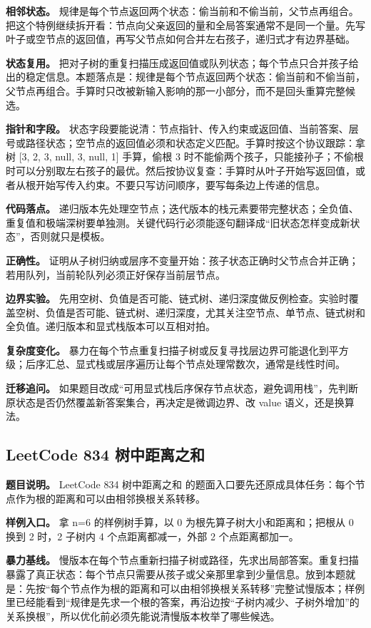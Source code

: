 \textbf{相邻状态。} 规律是每个节点返回两个状态：偷当前和不偷当前，父节点再组合。把这个特例继续拆开看：节点向父亲返回的量和全局答案通常不是同一个量。先写叶子或空节点的返回值，再写父节点如何合并左右孩子，递归式才有边界基础。

\textbf{状态复用。} 把对子树的重复扫描压成返回值或队列状态；每个节点只合并孩子给出的稳定信息。本题落点是：规律是每个节点返回两个状态：偷当前和不偷当前，父节点再组合。手算时只改被新输入影响的那一小部分，而不是回头重算完整候选。

\textbf{指针和字段。} 状态字段要能说清：节点指针、传入约束或返回值、当前答案、层号或路径状态；空节点的返回值必须和状态定义匹配。手算时按这个协议跟踪：拿树 [3, 2, 3, null, 3, null, 1] 手算，偷根 3 时不能偷两个孩子，只能接孙子；不偷根时可以分别取左右孩子的最优。然后按协议复查：手算时从叶子开始写返回值，或者从根开始写传入约束。不要只写访问顺序，要写每条边上传递的信息。

\textbf{代码落点。} 递归版本先处理空节点；迭代版本的栈元素要带完整状态；全负值、重复值和极端深树要单独测。关键代码行必须能逐句翻译成“旧状态怎样变成新状态”，否则就只是模板。

\textbf{正确性。} 证明从子树归纳或层序不变量开始：孩子状态正确时父节点合并正确；若用队列，当前轮队列必须正好保存当前层节点。

\textbf{边界实验。} 先用空树、负值是否可能、链式树、递归深度做反例检查。实验时覆盖空树、负值是否可能、链式树、递归深度，尤其关注空节点、单节点、链式树和全负值。递归版本和显式栈版本可以互相对拍。

\textbf{复杂度变化。} 暴力在每个节点重复扫描子树或反复寻找层边界可能退化到平方级；后序汇总、显式栈或层序遍历让每个节点处理常数次，通常是线性时间。

\textbf{迁移追问。} 如果题目改成“可用显式栈后序保存节点状态，避免调用栈”，先判断原状态是否仍然覆盖新答案集合，再决定是微调边界、改 value 语义，还是换算法。

\subsection{LeetCode 834 树中距离之和}

\textbf{题目说明。} LeetCode 834 树中距离之和 的题面入口要先还原成具体任务：每个节点作为根的距离和可以由相邻换根关系转移。

\textbf{样例入口。} 拿 n=6 的样例树手算，以 0 为根先算子树大小和距离和；把根从 0 换到 2 时，2 子树内 4 个点距离都减一，外部 2 个点距离都加一。

\textbf{暴力基线。} 慢版本在每个节点重新扫描子树或路径，先求出局部答案。重复扫描暴露了真正状态：每个节点只需要从孩子或父亲那里拿到少量信息。放到本题就是：先按“每个节点作为根的距离和可以由相邻换根关系转移”完整试慢版本；样例里已经能看到“规律是先求一个根的答案，再沿边按“子树内减少、子树外增加”的关系换根”，所以优化前必须先能说清慢版本枚举了哪些候选。

